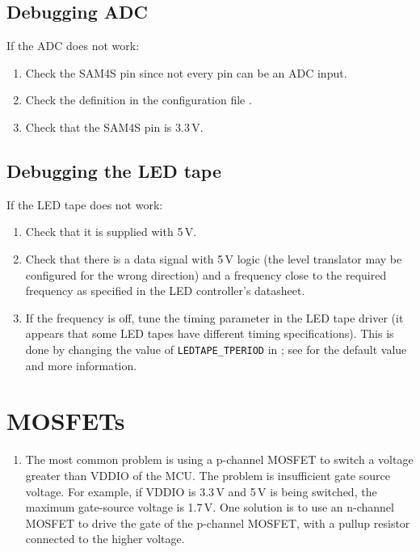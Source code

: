 \subsection{Debugging ADC}
\label{debugging-adc}

If the ADC does not work:
%
\begin{enumerate}
\item
  Check the SAM4S pin since not every pin can be an ADC input.

\item
  Check the definition in the configuration file .

\item
  Check that the SAM4S  pin is 3.3\,V.

\end{enumerate}


\subsection{Debugging the LED tape}

If the LED tape does not work:
%
\begin{enumerate}
\item Check that it is supplied with 5\,V.

\item Check that there is a data signal with 5\,V logic (the level
  translator may be configured for the wrong direction) and a
  frequency close to the required frequency as specified in the LED
  controller's datasheet.

\item If the frequency is off, tune the timing parameter in the LED
  tape driver (it appears that some LED tapes have different timing
  specifications). This is done by changing the value of
  \verb|LEDTAPE_TPERIOD| in ; see
   for the default value and more
  information.
\end{enumerate}


\section{MOSFETs}

\begin{enumerate}
\item The most common problem is using a p-channel MOSFET to switch a
  voltage greater than VDDIO of the MCU.  The problem is insufficient
  gate source voltage.  For example, if VDDIO is 3.3\,V and 5\,V is
  being switched, the maximum gate-source voltage is 1.7\,V.  One
  solution is to use an n-channel MOSFET to drive the gate of the
  p-channel MOSFET, with a pullup resistor connected to the higher
  voltage.
\end{enumerate}


